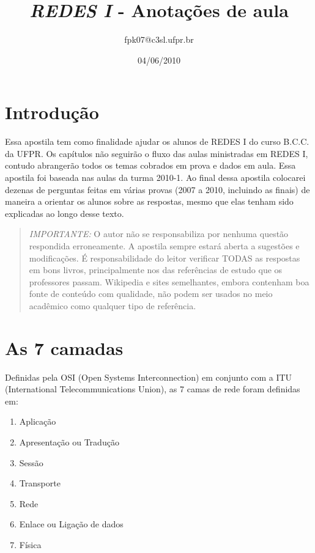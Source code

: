 \documentclass{article}
\title{\textit{REDES I} - Anotações de aula}
\author{fpk07@c3sl.ufpr.br}
\date{04/06/2010}
\begin{document}
\maketitle

\tableofcontents

\section{Introdução}

Essa apostila tem como finalidade ajudar os alunos de REDES I do curso B.C.C. da
UFPR. Os capítulos não seguirão o fluxo das aulas ministradas em REDES I,
contudo abrangerão todos os temas cobrados em prova e dados em aula. Essa
apostila foi baseada nas aulas da turma 2010-1. Ao final dessa apostila colocarei
dezenas de perguntas feitas em várias provas (2007 a 2010, incluindo as finais)
de maneira a orientar os alunos sobre as respostas, mesmo que elas tenham sido
explicadas ao longo desse texto. \\

\begin{quotation}
\textit{IMPORTANTE:} O autor não se responsabiliza por nenhuma questão respondida
erroneamente. A apostila sempre estará aberta a sugestões e modificações. É
responsabilidade do leitor verificar TODAS as respostas em bons livros,
principalmente nos das referências de estudo que os professores passam.
Wikipedia e sites semelhantes, embora contenham boa fonte de conteúdo com
qualidade, não podem ser usados no meio acadêmico como qualquer tipo de
referência.
\end{quotation}

\section{As 7 camadas}

Definidas pela OSI (Open Systems Interconnection) em conjunto com a ITU
(International Telecommunications Union), as 7 camas de rede foram definidas em:

\begin{enumerate}
	\item Aplicação
	\item Apresentação ou Tradução
	\item Sessão
	\item Transporte
	\item Rede
	\item Enlace ou Ligação de dados
	\item Física
\end{enumerate}
\end{document}
